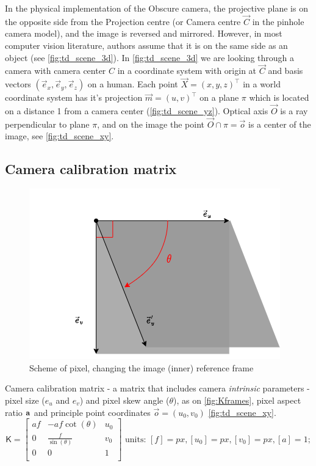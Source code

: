 In the physical implementation of the Obscure camera, the projective plane is on the opposite side from the Projection centre (or Camera centre $\vec{C}$ in the pinhole camera model), and the image is reversed and mirrored. However, in most computer vision literature, authors assume that it is on the same side as an object (see \autoref{fig:td_scene_3d}).
In \autoref{fig:td_scene_3d} we are looking through a camera with camera center $C$ in a coordinate system with origin at $\vec{C}$ and basis vectors $(\vec{e}_x, \vec{e}_y, \vec{e}_z)$ on a human. 
Each point $\vec{X} = (x, y, z)^\top$ in a world coordinate system has it's projection $\vec{m} = (u, v)^\top$ on a plane $\pi$ which is located on a distance 1 from a camera center (\autoref{fig:td_scene_yz}). 
Optical axis $\vec{O}$ is a ray perpendicular to plane $\pi$, and on the image the point $ \vec{O} \cap \pi = \vec{o}$ is a center of the image, see \autoref{fig:td_scene_xy}.

\subsection{Camera calibration matrix}
\begin{figure}[h]
    \centering
    \includegraphics[width=.6\textwidth]{graphics/pixel.png}
    \caption{Scheme of pixel, changing the image (inner) reference frame}
    \label{fig:Kframes}
\end{figure}
Camera calibration matrix - a matrix that includes camera \textit{intrinsic} parameters - pixel size ($e_u$ and $e_v$) and pixel skew angle ($\theta$), as on \autoref{fig:Kframes}, pixel aspect ratio $\bf{a}$ and principle point coordinates $\vec{o} = (u_0, v_0)$ \autoref{fig:td_scene_xy}.
\begin{equation}
    \pmb{\mathsf{K}} = \begin{bmatrix}
        af & -a f \cot(\theta) & u_0 \\
        0 & \frac{f}{\sin(\theta)} & v_0 \\
        0 & 0 & 1 \\
    \end{bmatrix} 
    \textrm{ units: } [f]=px, [u_0]=px, [v_0]=px, [a]=1;
\end{equation}


